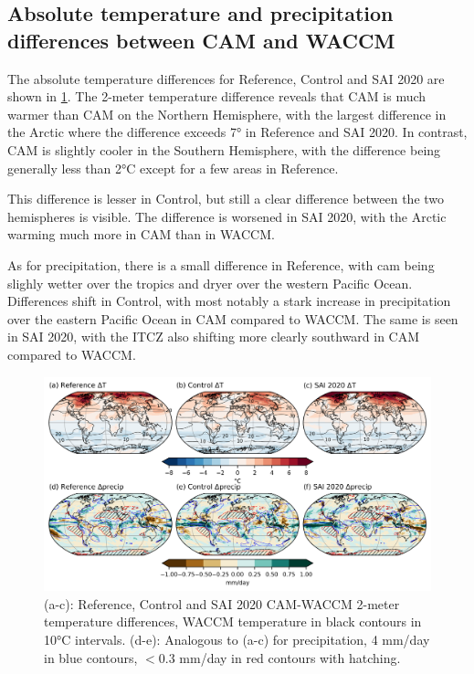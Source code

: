 \subsection{Absolute temperature and precipitation differences between CAM and WACCM}
The absolute temperature differences for Reference, Control and SAI 2020 are shown in \ref{fig:CAM_WACCM}. The 2-meter temperature difference reveals that CAM is much warmer than CAM on the Northern Hemisphere, with the largest difference in the Arctic where the difference exceeds 7° in Reference and SAI 2020. In contrast, CAM is slightly cooler in the Southern Hemisphere, with the difference being generally less than 2°C except for a few areas in Reference.

This difference is lesser in Control, but still a clear difference between the two hemispheres is visible. The difference is worsened in SAI 2020, with the Arctic warming much more in CAM than in WACCM. 

As for precipitation, there is a small difference in Reference, with cam being slighly wetter over the tropics and dryer over the western Pacific Ocean. Differences shift in Control, with most notably a stark increase in precipitation over the eastern Pacific Ocean in CAM compared to WACCM. The same is seen in SAI 2020, with the ITCZ also shifting more clearly southward in CAM compared to WACCM. 

\begin{figure}[H]
	\centering
	\includegraphics[width=0.95\linewidth]{images/CAM_WACCM.png}
	\caption{(a-c): Reference, Control and SAI 2020 CAM-WACCM 2-meter temperature differences, WACCM temperature in black contours in 10°C intervals. (d-e): Analogous to (a-c) for precipitation, 4 mm/day in blue contours, $<0.3$ mm/day in red contours with hatching.}
	\label{fig:CAM_WACCM}
\end{figure}


